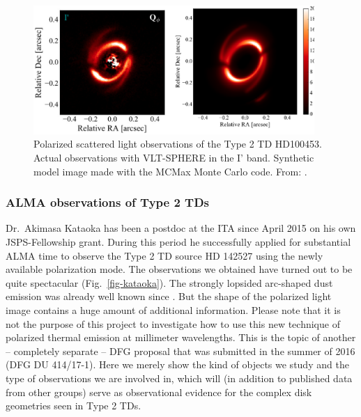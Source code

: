 \documentclass[10pt,fleqn,twoside,a4paper]{article}
\begin{document}
\begin{figure}
\centerline{\includegraphics[width=0.95\textwidth]{D2Fig/Benisty-eps-converted-to.pdf}}
\caption{\label{fig-benisty} Polarized scattered light observations of the
  Type 2 TD HD100453.  Actual observations with
  VLT-SPHERE in the I' band.  Synthetic model image
  made with the MCMax Monte Carlo code. From: \citet{2016arXiv161010089B}.}
\end{figure}

\subsubsection{ALMA observations of Type 2 TDs}
Dr.~Akimasa Kataoka has been a postdoc at the ITA since April 2015 on his
own JSPS-Fellowship grant. During this period he successfully applied for
substantial ALMA time to observe the Type 2 TD source HD 142527 using the
newly available polarization mode. The observations we obtained have turned
out to be quite spectacular (Fig.~\ref{fig-kataoka}). The strongly lopsided
arc-shaped dust emission was already well known since
\citep{2013Natur.493..191C}. But the shape of the polarized light image
contains a huge amount of additional information. Please note that it is not
the purpose of this project to investigate how to use this new technique of
polarized thermal emission at millimeter wavelengths. This is the topic of
another -- completely separate -- DFG proposal that was submitted in the
summer of 2016 (DFG DU 414/17-1). Here we merely show the kind of objects we
study and the type of observations we are involved in, which will (in
addition to published data from other groups) serve as observational
evidence for the complex disk geometries seen in Type 2 TDs.
\end{document}
